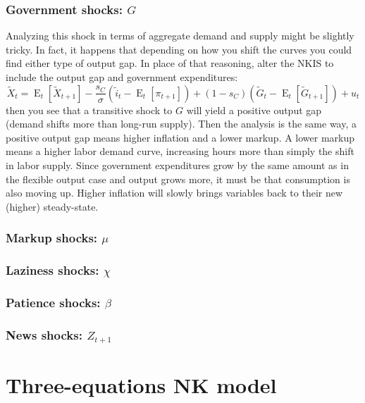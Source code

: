 \documentclass[12pt]{report}
\newcommand{\Et}[1]{\operatorname{E}_t\left[#1\right]}
\begin{document}
\subsubsection{Government shocks: $G$}

Analyzing this shock in terms of aggregate demand and supply might be slightly tricky. In fact, it happens that depending on how you shift the curves you could find either type of output gap. In place of that reasoning, alter the NKIS to include the output gap and government expenditures:$$ \tilde X_t = \Et{\tilde X_{t+1}} - \frac{s_C}{\sigma}\left(\tilde i_t - \Et{\pi_{t+1}}\right) + (1-s_C)\left(\tilde G_t - \Et{\tilde G_{t+1}}\right) + u_t $$ then you see that a transitive shock to $G$ will yield a positive output gap (demand shifts more than long-run supply). Then the analysis is the same way, a positive output gap means higher inflation and a lower markup. A lower markup means a higher labor demand curve, increasing hours more than simply the shift in labor supply. Since government expenditures grow by the same amount as in the flexible output case and output grows more, it must be that consumption is also moving up. Higher inflation will slowly brings variables back to their new (higher) steady-state.

\subsubsection{Markup shocks: $\mu$}



\subsubsection{Laziness shocks: $\chi$}



\subsubsection{Patience shocks: $\beta$}



\subsubsection{News shocks: $Z_{t+1}$}



\section{Three-equations NK model}
\end{document}

